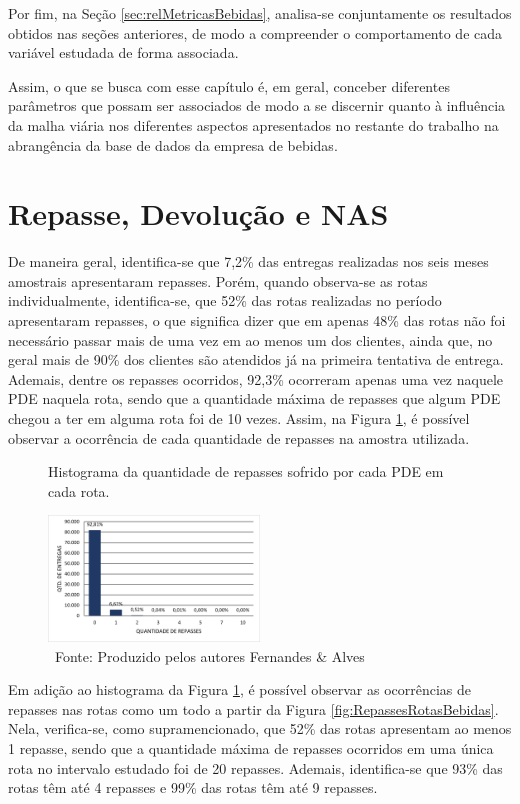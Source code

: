 Por fim, na Seção \ref{sec:relMetricasBebidas}, analisa-se conjuntamente os resultados obtidos nas seções anteriores, de modo a compreender o comportamento de cada variável estudada de forma associada.

Assim, o que se busca com esse capítulo é, em geral, conceber diferentes parâmetros que possam ser associados de modo a se discernir quanto à influência da malha viária nos diferentes aspectos apresentados no restante do trabalho na abrangência da base de dados da empresa de bebidas.

\section{Repasse, Devolução e NAS} \label{sec:indicadoresBebidas}

De maneira geral, identifica-se que 7,2\% das entregas realizadas nos seis meses amostrais apresentaram repasses.
Porém, quando observa-se as rotas individualmente, identifica-se, que 52\% das rotas realizadas no período apresentaram repasses, o que significa dizer que em apenas 48\% das rotas não foi necessário passar mais de uma vez em ao menos um dos clientes, ainda que, no geral mais de 90\% dos clientes são atendidos já na primeira tentativa de entrega.
Ademais, dentre os repasses ocorridos, 92,3\% ocorreram apenas uma vez naquele PDE naquela rota, sendo que a quantidade máxima de repasses que algum PDE chegou a ter em alguma rota foi de 10 vezes. 
Assim, na Figura \ref{fig:Repasses}, é possível observar a ocorrência de cada quantidade de repasses na amostra utilizada.

\begin{figure}[htb]
    \centering
    \caption{Histograma da quantidade de repasses sofrido por cada PDE em cada rota.}
    \includegraphics[width=0.5\textwidth]{images/5_emp_bebidas/excel_based/qtde_repasses1.png}
    \caption*{\ Fonte: Produzido pelos autores Fernandes \& Alves}
    \label{fig:Repasses}
\end{figure}

Em adição ao histograma da Figura \ref{fig:Repasses}, é possível observar as ocorrências de repasses nas rotas como um todo a partir da Figura \ref{fig:RepassesRotasBebidas}.
Nela, verifica-se, como supramencionado, que 52\% das rotas apresentam ao menos 1 repasse, sendo que a quantidade máxima de repasses ocorridos em uma única rota no intervalo estudado foi de 20 repasses.
Ademais, identifica-se que 93\% das rotas têm até 4 repasses e 99\% das rotas têm até 9 repasses.


